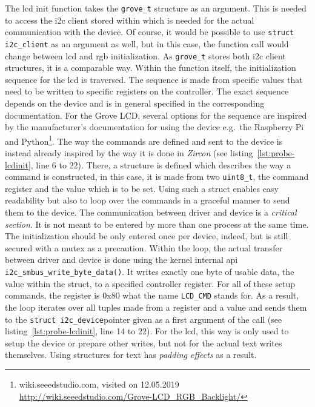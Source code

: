 %
The \ac{lcd} init function takes the \texttt{grove_t} structure as an argument.
This is needed to access the \ac{i2c} client stored within which is needed for the actual communication with the device.
Of course, it would be possible to use \texttt{struct i2c_client} as an argument as well, but in this case, the function call would change between \ac{lcd} and \ac{rgb} initialization.
As \texttt{grove_t} stores both \ac{i2c} client structures, it is a comparable way.
Within the function itself, the initialization sequence for the \ac{lcd} is traversed.
The sequence is made from specific values that need to be written to specific registers on the controller.
The exact sequence depends on the device and is in general specified in the corresponding documentation.
For the Grove LCD, several options for the sequence are inspired by the manufacturer's documentation for using the device e.g.\ the Raspberry Pi and Python\footnote{wiki.seeedstudio.com, visited on 12.05.2019 \url{http://wiki.seeedstudio.com/Grove-LCD_RGB_Backlight/}}.
The way the commands are defined and sent to the device is instead already inspired by the way it is done in \textit{Zircon} (see listing~\ref{lst:probe-lcdinit}, line 6 to 22).
There, a structure is defined which describes the way a command is constructed, in this case, it is made from two \texttt{uint8_t}, the command register and the value which is to be set.
Using such a struct enables easy readability but also to loop over the commands in a graceful manner to send them to the device.
The communication between driver and device is a \textit{critical section}.
It is not meant to be entered by more than one process at the same time.
The initialization should be only entered once per device, indeed, but is still secured with a mutex as a precaution.
Within the loop, the actual transfer between driver and device is done using the kernel internal \ac{api} \texttt{i2c_smbus_write_byte_data()}.
It writes exactly one byte of usable data, the value within the struct, to a specified controller register.
For all of these setup commands, the register is 0x80 what the name \texttt{LCD_CMD} stands for.
As a result, the loop iterates over all tuples made from a register and a value and sends them to the \texttt{struct i2c_device}pointer given as a first argument of the call (see listing~\ref{lst:probe-lcdinit}, line 14 to 22).
For the \ac{lcd}, this way is only used to setup the device or prepare other writes, but not for the actual text writes themselves.
Using structures for text has \textit{padding effects} as a result.
